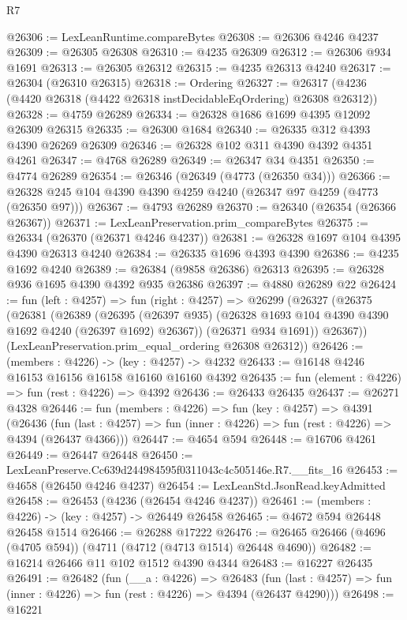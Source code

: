 \begin{lexlean}{R7}
\begin{coremodule}
@26306 := LexLeanRuntime.compareBytes
@26308 := @26306 @4246 @4237
@26309 := @26305 @26308
@26310 := @4235 @26309
@26312 := @26306 @934 @1691
@26313 := @26305 @26312
@26315 := @4235 @26313 @4240
@26317 := @26304 (@26310 @26315)
@26318 := Ordering
@26327 := @26317 (@4236 (@4420 @26318 (@4422 @26318 instDecidableEqOrdering) @26308 @26312))
@26328 := @4759 @26289
@26334 := @26328 @1686 @1699 @4395 @12092 @26309 @26315
@26335 := @26300 @1684
@26340 := @26335 @312 @4393 @4390 @26269 @26309
@26346 := @26328 @102 @311 @4390 @4392 @4351 @4261
@26347 := @4768 @26289
@26349 := @26347 @34 @4351
@26350 := @4774 @26289
@26354 := @26346 (@26349 (@4773 (@26350 @34)))
@26366 := @26328 @245 @104 @4390 @4390 @4259 @4240 (@26347 @97 @4259 (@4773 (@26350 @97)))
@26367 := @4793 @26289
@26370 := @26340 (@26354 (@26366 @26367))
@26371 := LexLeanPreservation.prim_compareBytes
@26375 := @26334 (@26370 (@26371 @4246 @4237))
@26381 := @26328 @1697 @104 @4395 @4390 @26313 @4240
@26384 := @26335 @1696 @4393 @4390
@26386 := @4235 @1692 @4240
@26389 := @26384 (@9858 @26386) @26313
@26395 := @26328 @936 @1695 @4390 @4392 @935 @26386
@26397 := @4880 @26289 @22
@26424 := fun (left : @4257) =>
  fun (right : @4257) =>
  @26299
    (@26327
      (@26375
        (@26381
          (@26389
            (@26395 (@26397 @935) (@26328 @1693 @104 @4390 @4390 @1692 @4240 (@26397 @1692) @26367))
            (@26371 @934 @1691))
          @26367))
      (LexLeanPreservation.prim_equal_ordering @26308 @26312))
@26426 := (members : @4226) -> (key : @4257) -> @4232
@26433 := @16148 @4246 @16153 @16156 @16158 @16160 @16160 @4392
@26435 := fun (element : @4226) => fun (rest : @4226) => @4392
@26436 := @26433 @26435
@26437 := @26271 @4328
@26446 := fun (members : @4226) =>
  fun (key : @4257) =>
  @4391
    (@26436
      (fun (last : @4257) => fun (inner : @4226) => fun (rest : @4226) => @4394 (@26437 @4366)))
@26447 := @4654 @594
@26448 := @16706 @4261
@26449 := @26447 @26448
@26450 := LexLeanPreserve.Cc639d244984595f0311043c4c505146e.R7.__fits_16
@26453 := @4658 (@26450 @4246 @4237)
@26454 := LexLeanStd.JsonRead.keyAdmitted
@26458 := @26453 (@4236 (@26454 @4246 @4237))
@26461 := (members : @4226) -> (key : @4257) -> @26449 @26458
@26465 := @4672 @594 @26448 @26458 @1514
@26466 := @26288 @17222
@26476 := @26465 @26466 (@4696 (@4705 @594)) (@4711 (@4712 (@4713 @1514) @26448 @4690))
@26482 := @16214 @26466 @11 @102 @1512 @4390 @4344
@26483 := @16227 @26435
@26491 := @26482
    (fun (__a : @4226) =>
    @26483
      (fun (last : @4257) => fun (inner : @4226) => fun (rest : @4226) => @4394 (@26437 @4290)))
@26498 := @16221

\end{coremodule}
\end{lexlean}
